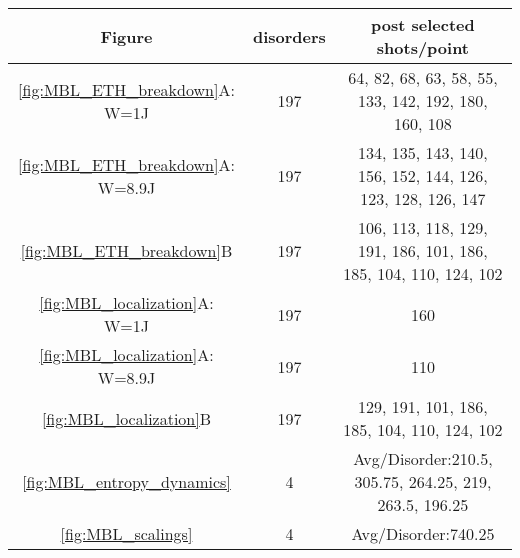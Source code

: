 \begin{center}
	\begin{tabular}{|c|c|c|}
		\hline Figure &disorders& post selected shots/point\\
		\hline \ref{fig:MBL_ETH_breakdown}A: W=1J& 197 & 64, 82, 68, 63, 58, 55, 133, 142, 192, 180, 160, 108\\ 
		\hline \ref{fig:MBL_ETH_breakdown}A: W=8.9J& 197 & 134, 135, 143, 140, 156, 152, 144, 126, 123, 128, 126, 147 \\ 
		\hline \ref{fig:MBL_ETH_breakdown}B & 197 &106, 113, 118, 129, 191, 186, 101, 186, 185, 104, 110, 124, 102\\ 
		\hline \ref{fig:MBL_localization}A: W=1J& 197 & 160\\ 
		\hline \ref{fig:MBL_localization}A: W=8.9J& 197 & 110 \\ 
		\hline \ref{fig:MBL_localization}B & 197 & 129, 191, 101, 186, 185, 104, 110, 124, 102 \\ 
		\hline \ref{fig:MBL_entropy_dynamics} & 4 & Avg/Disorder:210.5, 305.75, 264.25, 219, 263.5, 196.25\\
		\hline \ref{fig:MBL_scalings} & 4 & Avg/Disorder:740.25\\
		\hline
	\end{tabular} 
\end{center}